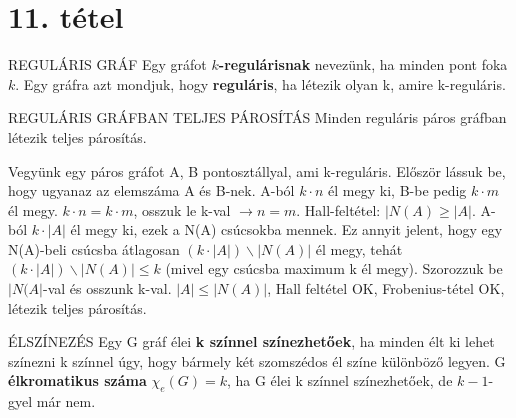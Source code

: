 \section{11. tétel}


\begin{definicio}{REGULÁRIS GRÁF}
Egy gráfot \textbf{$k$-regulárisnak} nevezünk, ha minden pont foka $k$. Egy gráfra azt mondjuk, hogy \textbf{reguláris}, ha létezik olyan k, amire k-reguláris.
\end{definicio}

\begin{tetel}{REGULÁRIS GRÁFBAN TELJES PÁROSÍTÁS}
Minden reguláris páros gráfban létezik teljes párosítás.
\end{tetel}

\begin{bizonyitas}{}
Vegyünk egy páros gráfot A, B pontosztállyal, ami k-reguláris. Először lássuk be, hogy ugyanaz az elemszáma A és B-nek. A-ból $k\cdot n$ él megy ki, B-be pedig $k \cdot m$ él megy. $k\cdot n = k\cdot m$, osszuk le k-val $\rightarrow n = m$. Hall-feltétel: $|N(A) \geq |A|$. A-ból $k\cdot|A|$ él megy ki, ezek a N(A) csúcsokba mennek. Ez annyit jelent, hogy egy N(A)-beli csúcsba átlagosan $(k\cdot |A|) \backslash |N(A)|$ él megy, tehát $(k\cdot |A|) \backslash |N(A)| \leq k$ (mivel egy csúcsba maximum k él megy). Szorozzuk be $|N(A|$-val és osszunk k-val. $|A| \leq |N(A)|$, Hall feltétel OK, Frobenius-tétel OK, létezik teljes párosítás.
\end{bizonyitas}

\begin{definicio}{ÉLSZÍNEZÉS}
Egy G gráf élei \textbf{k színnel színezhetőek}, ha minden élt ki lehet színezni k színnel úgy, hogy bármely két szomszédos él színe különböző legyen. G \textbf{élkromatikus száma} $\chi_e(G) = k$, ha G élei k színnel színezhetőek, de $k - 1$-gyel már nem.
\end{definicio}

